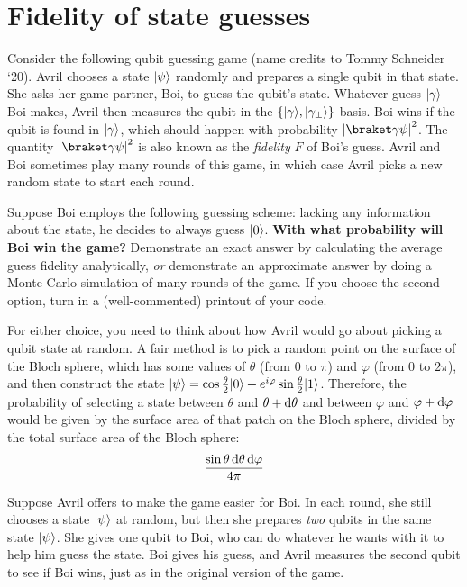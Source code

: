 \documentclass{../phys084}
\begin{document}
\begin{solution}
\end{solution}

\section{Fidelity of state guesses}

\begin{exercise}
  Consider the following qubit guessing game (name credits to Tommy
  Schneider `20).  Avril chooses a state \(\ket \psi\) randomly and
  prepares a single qubit in that state.  She asks her game partner,
  Boi, to guess the qubit's state.  Whatever guess \(\ket \gamma\) Boi
  makes, Avril then measures the qubit in the
  \(\set*{\ket \gamma, \ket{\gamma_\perp}}\) basis.  Boi wins if the
  qubit is found in \(\ket \gamma\), which should happen with
  probability \(\abs*{\braket \gamma \psi}^2\).  The quantity
  \(\abs*{\braket \gamma \psi}^2\) is also known as the
  \textit{fidelity} \(F\) of Boi's guess.  Avril and Boi sometimes
  play many rounds of this game, in which case Avril picks a new
  random state to start each round.
  \begin{problems}
  \item Suppose Boi employs the following guessing scheme: lacking any
    information about the state, he decides to always guess
    \(\ket 0\).  \textbf{With what probability will Boi win the game?}
    Demonstrate an exact answer by calculating the average guess
    fidelity analytically, \textit{or} demonstrate an approximate
    answer by doing a Monte Carlo simulation of many rounds of the
    game.  If you choose the second option, turn in a (well-commented)
    printout of your code.

    For either choice, you need to think about how Avril would go
    about picking a qubit state at random.  A fair method is to pick a
    random point on the surface of the Bloch sphere, which has some
    values of \(\theta\) (from \(0\) to \(\pi\)) and \(\varphi\) (from
    \(0\) to \(2\pi\)), and then construct the state
    \(\ket \psi = \cos \frac \theta 2 \ket 0 + e^{i\varphi} \sin \frac
    \theta 2 \ket 1\).  Therefore, the probability of selecting a
    state between \(\theta\) and \(\theta + \dif \theta\) and between
    \(\varphi\) and \(\varphi + \dif \varphi\) would be given by the
    surface area of that patch on the Bloch sphere, divided by the
    total surface area of the Bloch sphere:
    \[
      \frac{\sin \theta \dif \theta \dif \varphi}{4 \pi}
    \]
  \item Suppose Avril offers to make the game easier for Boi.  In each
    round, she still chooses a state \(\ket \psi\) at random, but then
    she prepares \textit{two} qubits in the same state \(\ket \psi\).
    She gives one qubit to Boi, who can do whatever he wants with it
    to help him guess the state. Boi gives his guess, and Avril
    measures the second qubit to see if Boi wins, just as in the
    original version of the game.


\end{problems}
\end{exercise}
\end{document}
